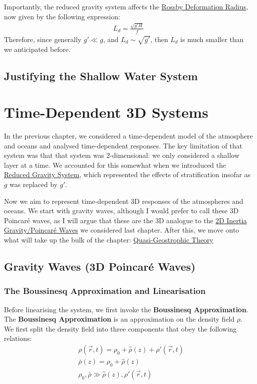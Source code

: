 Importantly, the reduced gravity system affects the \hyperref[SW Def Radius Box]{Rossby Deformation Radius}, now given by the following expression:
\begin{align*}
    L_d = \frac{\sqrt{g' H}}{f}
\end{align*}
Therefore, since generally $g'\ll g$, and $L_d\sim\sqrt{g'}$, then $L_d$ is much smaller than we anticipated before.

\section{Justifying the Shallow Water System}\label{SW Justification}

\chapter{Time-Dependent 3D Systems}\label{3D Systems}

In the previous chapter, we considered a time-dependent model of the atmosphere and oceans and analysed time-dependent responses. The key limitation of that system was that that system was $2$-dimensional: we only considered a shallow layer at a time. We accounted for this somewhat when we introduced the \hyperref[RG Box]{Reduced Gravity System}, which represented the effects of stratification insofar as $g$ was replaced by $g'$. 

Now we aim to represent time-dependent 3D responses of the atmospheres and oceans. We start with gravity waves, although I would prefer to call these 3D Poincaré waves, as I will argue that these are the 3D analogue to the \hyperref[2D Poincare]{2D Inertia Gravity/Poincaré Waves} we considered last chapter. After this, we move onto what will take up the bulk of the chapter: \hyperref[QG]{Quasi-Geostrophic Theory}

\section{Gravity Waves (3D Poincaré Waves)}

\subsection{The Boussinesq Approximation and Linearisation}

Before linearising the system, we first invoke the \textbf{Boussinesq Approximation}. The \textbf{Boussinesq Approximation} is an approximation on the density field $\rho$. We first split the density field into three components that obey the following relations:
\begin{align*}
    &\rho(\vec{r},t)=\rho_0 + \hat{\rho}(z) + \rho'(\vec{r},t)
    \\
    &\bar{\rho}(z)=\rho_0 + \hat{\rho}(z)
    \\
    &\rho_0,\bar{\rho} \gg \hat{\rho}(z),\rho'(\vec{r},t)
\end{align*}

